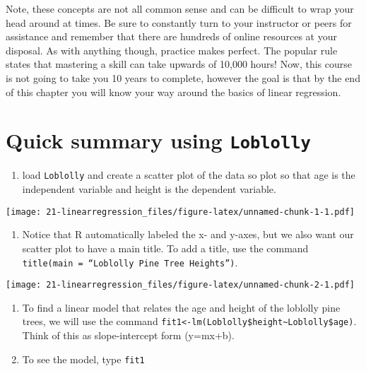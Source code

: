 \documentclass[
]{book}
\providecommand{\tightlist}{%
  \setlength{\itemsep}{0pt}\setlength{\parskip}{0pt}}
\begin{document}
Note, these concepts are not all common sense and can be difficult to wrap your head around at times. Be sure to constantly turn to your instructor or peers for assistance and remember that there are hundreds of online resources at your disposal. As with anything though, practice makes perfect. The popular rule states that mastering a skill can take upwards of 10,000 hours! Now, this course is not going to take you 10 years to complete, however the goal is that by the end of this chapter you will know your way around the basics of linear regression.

\hypertarget{quick-summary-using-loblolly}{%
\section{\texorpdfstring{Quick summary using \texttt{Loblolly}}{Quick summary using Loblolly}}\label{quick-summary-using-loblolly}}

\begin{enumerate}
\def\labelenumi{\arabic{enumi}.}
\tightlist
\item
  load \texttt{Loblolly} and create a scatter plot of the data so plot so that age is the independent variable and height is the
  dependent variable.
\end{enumerate}

\texttt{[image: 21-linearregression\_files/figure-latex/unnamed-chunk-1-1.pdf]}

\begin{enumerate}
\def\labelenumi{\arabic{enumi}.}
\setcounter{enumi}{1}
\tightlist
\item
  Notice that R automatically labeled the x- and y-axes, but we also want our scatter plot to
  have a main title. To add a title, use the command \texttt{title(main\ =\ “Loblolly\ Pine\ Tree\ Heights”)}.
\end{enumerate}

\texttt{[image: 21-linearregression\_files/figure-latex/unnamed-chunk-2-1.pdf]}

\begin{enumerate}
\def\labelenumi{\arabic{enumi}.}
\setcounter{enumi}{2}
\item
  To find a linear model that relates the age and height of the loblolly pine trees, we will use the
  command \texttt{fit1\textless{}-lm(Loblolly\$height\textasciitilde{}Loblolly\$age)}. Think of this as slope-intercept form (y=mx+b).
\item
  To see the model, type \texttt{fit1}
\end{enumerate}
\end{document}
